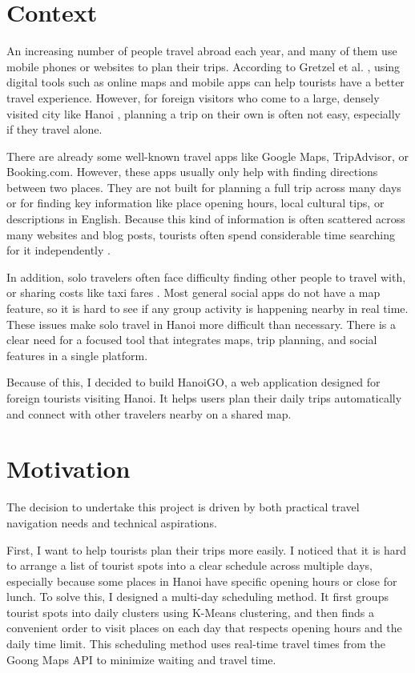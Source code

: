 \documentclass[a4paper,12pt]{report}
\begin{document}
\section{Context}

An increasing number of people travel abroad each year, and many of them use mobile phones or websites to plan their trips. According to Gretzel et al. \cite{gretzel2015smart}, using digital tools such as online maps and mobile apps can help tourists have a better travel experience. However, for foreign visitors who come to a large, densely visited city like Hanoi \cite{vietnamtourism2024}, planning a trip on their own is often not easy, especially if they travel alone.

There are already some well-known travel apps like Google Maps, TripAdvisor, or Booking.com. However, these apps usually only help with finding directions between two places. They are not built for planning a full trip across many days or for finding key information like place opening hours, local cultural tips, or descriptions in English. Because this kind of information is often scattered across many websites and blog posts, tourists often spend considerable time searching for it independently \cite{buhalis2020smartness}.

In addition, solo travelers often face difficulty finding other people to travel with, or sharing costs like taxi fares \cite{buhalis2019cocreation}. Most general social apps do not have a map feature, so it is hard to see if any group activity is happening nearby in real time. These issues make solo travel in Hanoi more difficult than necessary. There is a clear need for a focused tool that integrates maps, trip planning, and social features in a single platform.

Because of this, I decided to build HanoiGO, a web application designed for foreign tourists visiting Hanoi. It helps users plan their daily trips automatically and connect with other travelers nearby on a shared map.

\section{Motivation}

The decision to undertake this project is driven by both practical travel navigation needs and technical aspirations.

First, I want to help tourists plan their trips more easily. I noticed that it is hard to arrange a list of tourist spots into a clear schedule across multiple days, especially because some places in Hanoi have specific opening hours or close for lunch. To solve this, I designed a multi-day scheduling method. It first groups tourist spots into daily clusters using K-Means clustering, and then finds a convenient order to visit places on each day that respects opening hours and the daily time limit. This scheduling method uses real-time travel times from the Goong Maps API to minimize waiting and travel time.
\end{document}

